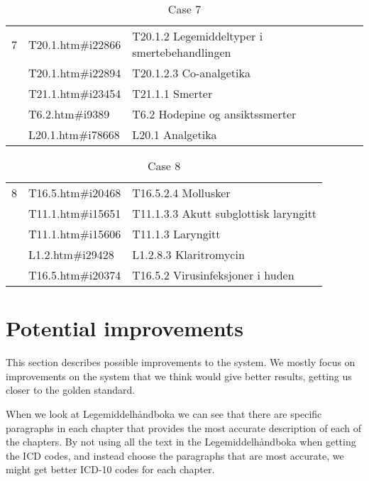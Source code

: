 \begin{table}[htbp]\centering\footnotesize
\caption{Case 7}
\begin{tabular}{cll}
\toprule
7 & T20.1.htm\#i22866  & T20.1.2 Legemiddeltyper i smertebehandlingen \\
  & T20.1.htm\#i22894  & T20.1.2.3 Co-analgetika \\
  & T21.1.htm\#i23454  & T21.1.1 Smerter \\
  & T6.2.htm\#i9389    & T6.2 Hodepine og ansiktssmerter \\
  & L20.1.htm\#i78668  & L20.1 Analgetika \\
\bottomrule
\end{tabular}
\end{table}
\begin{table}[htbp]\centering\footnotesize
\caption{Case 8}
\begin{tabular}{cll}
\toprule
8 & T16.5.htm\#i20468  & T16.5.2.4 Mollusker \\
  & T11.1.htm\#i15651  & T11.1.3.3 Akutt subglottisk laryngitt \\
  & T11.1.htm\#i15606  & T11.1.3 Laryngitt \\
  & L1.2.htm\#i29428   & L1.2.8.3 Klaritromycin \\
  & T16.5.htm\#i20374  & T16.5.2 Virusinfeksjoner i huden \\
\bottomrule
\end{tabular}
\end{table}
\newpage

\section{Potential improvements}
\label{sec:potential-improvements}

This section describes possible improvements to the system. We mostly focus on
improvements on the system that we think would give better results, getting us
closer to the golden standard.

When we look at Legemiddelhåndboka we can see that there are specific paragraphs
in each chapter that provides the most accurate description of each of the
chapters. By not using all the text in the Legemiddelhåndboka when getting the
ICD codes, and instead choose the paragraphs that are most accurate, we might
get better ICD-10 codes for each chapter.

